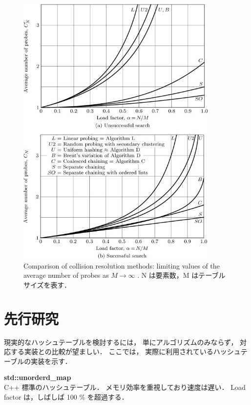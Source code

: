 \begin{figure} %
  \centering
  \includegraphics[width=10cm]{./fig/taocp_v3_fig44.png}
  \caption{
    Comparison of collision resolution methods: limiting values of the average number of probes as $M \rightarrow \infty$ \citep{knuth1998}.
    N は要素数，M はテーブルサイズを表す．
  }
  \label{fig_taocp_v3_fig44}
\end{figure}


\section{先行研究}
現実的なハッシュテーブルを検討するには，
単にアルゴリズムのみならず，
対応する実装との比較が望ましい．
ここでは，
実際に利用されているハッシュテーブルの実装を示す．
\leavevmode \newline

{\bf std::unorderd\_map}
\samepage \\ \indent
C++ 標準のハッシュテーブル．
メモリ効率を重視しており速度は遅い．
Load factor は，しばしば 100 \% を超過する．

